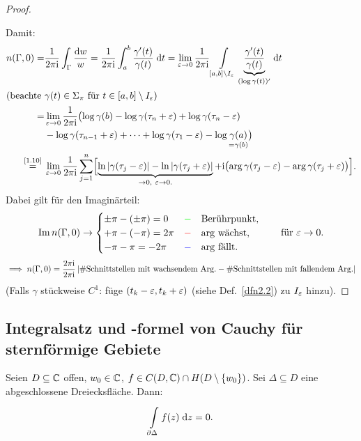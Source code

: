 \documentclass[a4paper,twoside,DIV15,BCOR12mm]{scrbook}
\begin{document}
\begin{proof}
\begin{center}
\end{center}

Damit:
\begin{align*}
n(\Gamma,0) = &\frac{1}{2\pi\i}\int_\Gamma\frac{\d w}{w} = \frac{1}{2\pi\i}\integral{a}{b}{\frac{\gamma^\prime(t)}{\gamma(t)}}{t} = \lim_{\ep\ra 0}\frac{1}{2\pi\i}\Integral{[a,b]\setminus I_\ep}{}{\underbrace{\frac{\gamma^\prime(t)}{\gamma(t)}}_{(\log\gamma(t))^\prime}}{t}\\
\intertext{(beachte $\gamma(t)\in\Sigma_\pi$ für $t\in[a,b]\setminus I_\ep$)}
=&\lim_{\ep\ra 0}\frac{1}{2\pi\i}\bigl(\log\gamma(b)-\log\gamma(\tau_n+\ep)+\log\gamma(\tau_n-\ep)\\
&-\log\gamma(\tau_{n-1}+\ep)+\dotsb+\log\gamma(\tau_1-\ep)-\log\underset{=\gamma(b)}{\gamma(a)}\bigr)\\
\nach{=}{\eqref{1.10}}&\lim_{\ep\ra0}\frac{1}{2\pi\i}\sum_{j=1}^n\Bigl[\underbrace{\ln\abs{\gamma(\tau_j-\ep)}-\ln\abs{\gamma(\tau_j+\ep)}}_{\ra0,\ \ep\ra0.}+\i\bigl(\arg\gamma(\tau_j-\ep)-\arg\gamma(\tau_j+\ep)\bigr)\Bigr].
\end{align*}
Dabei gilt für den Imaginärteil:
\[\operatorname{Im}{n(\Gamma,0)} \rightarrow\begin{cases}\pm\pi-(\pm\pi) = 0&\text{\textcolor{green}{$-\quad$}Berührpunkt,}\\+\pi-(-\pi) = 2\pi&\text{\textcolor{red}{$-\quad$}$\arg$ wächst,}\\-\pi-\pi=-2\pi&\text{\textcolor{blue}{$-\quad$}$\arg$ fällt.}\end{cases}\qquad\text{für }\varepsilon\rightarrow 0.\]
\[\implies n(\Gamma,0) = \frac{2\pi\mathrm{i}}{2\pi\mathrm{i}}\left\lvert\text{\#Schnittstellen mit wachsendem Arg.} - \text{\#Schnittstellen mit fallendem Arg.}\right\lvert\]
(Falls $\gamma$ stückweise $C^1$: füge $(t_k-\varepsilon,t_k+\varepsilon)$ (siehe Def.~\ref{dfn2.2}) zu $I_\varepsilon$ hinzu).
\end{proof}

\subsection{Integralsatz und -formel von Cauchy für sternförmige Gebiete}

\begin{satz}[Goursat]\label{satz2.19} Seien $D\subseteq\mathbb{C}$ offen, $w_0\in\mathbb{C}$, $f\in C(D,\mathbb{C})\cap H(D\setminus\{w_0\})$. Sei $\Delta\subseteq D$ eine abgeschlossene Dreiecksfläche. Dann:
\[\int\limits_{\partial\Delta}^{}{f(z)}\;\mathrm{d}z=0.\]
\end{satz}
\end{document}
